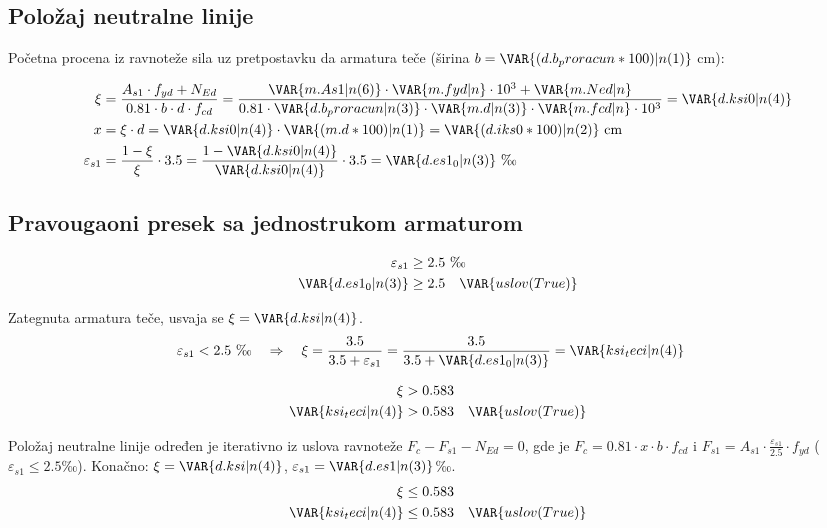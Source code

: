 \subsection{Položaj neutralne linije}

Početna procena iz ravnoteže sila uz pretpostavku da armatura teče (širina $b = \VAR{(d.b_proracun*100)|n(1)}$ cm):

\begin{align*}
\xi &= \frac{A_{s1} \cdot f_{yd} + N_{Ed}}{0.81 \cdot b \cdot d \cdot f_{cd}} = \frac{\VAR{m.As1|n(6)} \cdot \VAR{m.fyd|n} \cdot 10^3 + \VAR{m.Ned|n}}{0.81 \cdot \VAR{d.b_proracun|n(3)} \cdot \VAR{m.d|n(3)} \cdot \VAR{m.fcd|n} \cdot 10^3} = \VAR{d.ksi0|n(4)} \\
x &= \xi \cdot d = \VAR{d.ksi0|n(4)} \cdot \VAR{(m.d*100)|n(1)} = \VAR{(d.iks0*100)|n(2)} \ \mathrm{cm} \\
\varepsilon_{s1} &= \frac{1 - \xi}{\xi} \cdot 3.5 = \frac{1 - \VAR{d.ksi0|n(4)}}{\VAR{d.ksi0|n(4)}} \cdot 3.5 = \VAR{d.es1_0|n(3)} \ \text{‰}
\end{align*}

\subsection{Pravougaoni presek sa jednostrukom armaturom}

\begin{align*}
\varepsilon_{s1} &\geq 2.5 \ \text{‰} \\
\VAR{d.es1_0|n(3)} &\geq 2.5 \quad \VAR{uslov(True)}
\end{align*}

Zategnuta armatura teče, usvaja se $\xi = \VAR{d.ksi|n(4)}$.
\begin{align*}
\varepsilon_{s1} &< 2.5 \ \text{‰} \quad \Rightarrow \quad \xi = \frac{3.5}{3.5 + \varepsilon_{s1}} = \frac{3.5}{3.5 + \VAR{d.es1_0|n(3)}} = \VAR{ksi_teci|n(4)}
\end{align*}

\begin{align*}
\xi &> 0.583 \\
\VAR{ksi_teci|n(4)} &> 0.583 \quad \VAR{uslov(True)}
\end{align*}

Položaj neutralne linije određen je iterativno iz uslova ravnoteže $F_c - F_{s1} - N_{Ed} = 0$, gde je
$F_c = 0.81 \cdot x \cdot b \cdot f_{cd}$ i $F_{s1} = A_{s1} \cdot \frac{\varepsilon_{s1}}{2.5} \cdot f_{yd}$ ($\varepsilon_{s1} \leq 2.5$‰). Konačno: $\xi = \VAR{d.ksi|n(4)}$, $\varepsilon_{s1} = \VAR{d.es1|n(3)}$‰.
\begin{align*}
\xi &\leq 0.583 \\
\VAR{ksi_teci|n(4)} &\leq 0.583 \quad \VAR{uslov(True)}
\end{align*}

